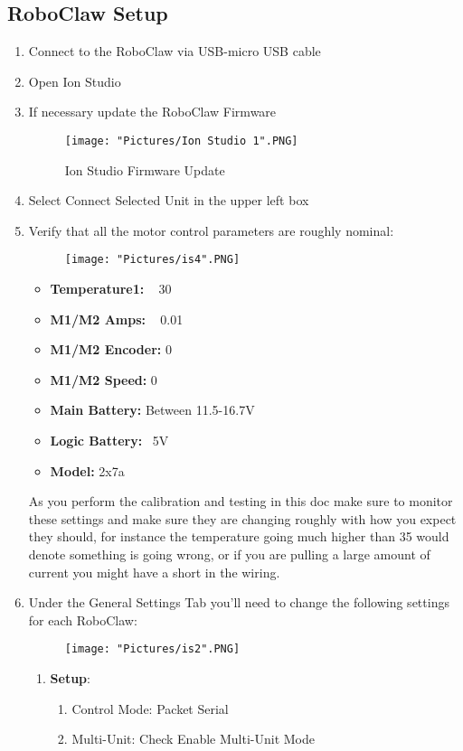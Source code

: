 \documentclass[12pt]{article}
\begin{document}
\subsection{RoboClaw Setup}
\begin{enumerate}
	\item Connect to the RoboClaw via USB-micro USB cable
	\item Open Ion Studio
	\item If necessary update the RoboClaw Firmware
	\begin{figure}[H]
 		\centering
		\texttt{[image: "Pictures/Ion Studio 1".PNG]}
 		\caption{Ion Studio Firmware Update}
	\end{figure}
	
	\item Select Connect Selected Unit in the upper left box
	\item Verify that all the motor control parameters are roughly nominal:
	\begin{figure}[H]
 		\centering
		\texttt{[image: "Pictures/is4".PNG]}
 		\caption{}
	\end{figure}
	\begin{itemize}
		\item \textbf{Temperature1:} ~ 30
		\item \textbf{M1/M2 Amps:} ~ 0.01
		\item \textbf{M1/M2 Encoder:} 0
		\item \textbf{M1/M2 Speed:} 0
		\item \textbf{Main Battery:} Between 11.5-16.7V
		\item \textbf{Logic Battery:} ~5V
		\item \textbf{Model:} 2x7a
	\end{itemize}
	\noindent As you perform the calibration and testing in this doc make sure to monitor these settings and make sure they are changing roughly with how you expect they should, for instance the temperature going much higher than 35 would denote something is going wrong, or if you are pulling a large amount of current you might have a short in the wiring. 
	\item Under the General Settings Tab you'll need to change the following settings for each RoboClaw:
	\begin{figure}[H]
 		\centering
		\texttt{[image: "Pictures/is2".PNG]}
 		\caption{}
	\end{figure}
	\begin{enumerate}
		\item \textbf{Setup}:
		\begin{enumerate}
			\item Control Mode: Packet Serial
			\item Multi-Unit: Check Enable Multi-Unit Mode
		\end{enumerate}


\end{enumerate}
\end{enumerate}
\end{document}
